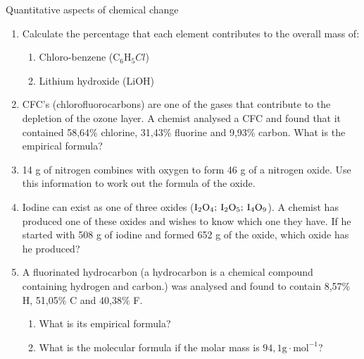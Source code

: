\begin{eocexercises}{Quantitative aspects of chemical change}
\begin{enumerate}[noitemsep, label=\textbf{\arabic*}. ]
\begin{enumerate}[noitemsep, label=\textbf{\alph*}. ]
            \item 0,2 mol of potassium hydroxide ($\text{KOH}$)\item 0,47 mol of nitrogen dioxide\item 5,2 mol of helium\item 0,05 mol of copper (II) chloride (${\text{CuCl}}_{2}$)\item $31,31\ensuremath{\times}{10}^{23}$ molecules of carbon monoxide ($\text{CO}$)\end{enumerate}
\item Calculate the percentage that each element contributes to the overall mass of:
\label{m38712*id6334}\begin{enumerate}[noitemsep, label=\textbf{\alph*}. ] 
            \item Chloro-benzene (${\text{C}}_{6}{\text{H}}_{5}Cl$)\item Lithium hydroxide ($\text{LiOH}$)\end{enumerate}
\item CFC's (chlorofluorocarbons) are one of the gases that contribute to the depletion of the ozone layer. A chemist analysed a CFC and found that it contained 58,64\% chlorine, 31,43\% fluorine and 9,93\% carbon. What is the empirical formula?\newline
\item 14 g of nitrogen combines with oxygen to form 46 g of a nitrogen oxide. Use this information to work out the formula of the oxide.\newline
            \item Iodine can exist as one of three oxides (${\text{I}}_{2}{\text{O}}_{4};\phantom{\rule{2pt}{0ex}}{\text{I}}_{2}{\text{O}}_{5};\phantom{\rule{2pt}{0ex}}{\text{I}}_{4}{\text{O}}_{9}$). A chemist has produced one of these oxides and wishes to know which one they have. If he started with 508 g of iodine and formed 652 g of the oxide, which oxide has he produced?\newline
            \item A fluorinated hydrocarbon (a hydrocarbon is a chemical compound containing hydrogen and carbon.) was analysed and found to contain 8,57\% H, 51,05\% C and 40,38\% F.\label{m38712*id73222}\begin{enumerate}[noitemsep, label=\textbf{\alph*}. ] 
            \item What is its empirical formula?\item What is the molecular formula if the molar mass is $94,1\text{g}\cdot {\text{mol}}^{-1}$?\end{enumerate}

\end{enumerate}
\end{eocexercises}
